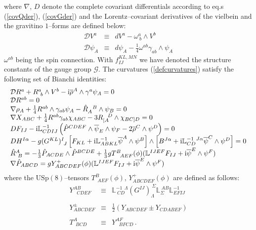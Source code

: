 \documentclass[a4paper,12pt]{article}
\def\bar{\overline}\end {picture}}
\begin{document}
where $\nabla$, $D$ denote the complete covariant differentials
according to eq.s (\ref{covQder}), (\ref{covGder}) and the
Lorentz--covariant
derivatives of the vielbein and the gravitino
$1$--forms are defined below:
\begin{eqnarray}
\mathcal{D} V^a &\equiv& dV^a-\omega ^a_{~b}\wedge V^b \nonumber \\
\mathcal{D}\psi_A &\equiv& d\psi_A - \frac{1}{4}\omega ^{ab}\gamma_{ab}\wedge\psi_A
\end{eqnarray}
$\omega ^{ab}$ being the spin connection. With $f_{IJ}^{KL,MN}$ we have denoted
the structure constants of the gauge group $\mathcal{G}$.
The curvatures (\ref{defcurvatures}) satisfy the following set of Bianchi identities:
\begin{equation}
\begin{array}{l}
\mathcal{D} R^a + R^a_{~b}\wedge V^b -{\rm i} \bar{\rho}^A\wedge\gamma^a\psi_A = 0 \nonumber\\
\mathcal{D} R^{ab} = 0 \nonumber\\
\nabla\rho _A + \frac{1}{4} R^{ab}\wedge\gamma_{ab}\psi_A - \hat{R}_{A}^{~~B}\wedge\psi_B =  0 \nonumber \\
\nabla X_{ABC} + \frac{1}{4} R^{ab}\gamma_{ab}\chi_{ABC} - 3
R_{[A}^{~~D}\wedge\chi_{BC]D} =  0 \nonumber \\
DF_{IJ} - {\rm i}\mathbb{L}^{-1}_{CDIJ}\left(\hat{P}^{CDEF}\wedge\bar{\psi}_E\wedge\psi_F
- 2 \bar{\rho}^C\wedge\psi^D\right) = 0 \nonumber\\
DH^{I\alpha} - g (G^{KL})^I_{~J}\left[F_{KL}+{\rm i}\mathbb{L}^{-1}_{ABKL}\bar{\psi}^A\wedge\psi^B\right]\wedge
\left[B^{J\alpha}+{\rm i}\mathbb{L}^{-1~J\alpha}_{CD}\bar{\psi}^C\wedge\psi^D\right] = 0\nonumber\\
\hat{R}^A_{~B}=-{1\over 3}\hat{P}_{ACDE}\wedge\hat{P}^{BCDE}+{1\over 3}gT^B_{~~AEF}(\phi)
(\mathbb{L}^{IJEF}F_{IJ}+{\rm i}{\bar \psi}^E\wedge\psi^F) \nonumber\\
\nabla\hat{P}_{ABCD}=gY^+_{ABCDEF}(\phi)(\mathbb{L}^{IJEF}F_{IJ}+{\rm i}{\bar \psi}^E\wedge\psi^F)
\nonumber\\
\end{array}
\label{bianchi}
\end{equation}
where the $\mathrm{USp(8)}$--tensors $T^B_{~~AEF}(\phi)$, $Y^+_{ABCDEF}(\phi)$ are defined as follows:
\begin{eqnarray}
Y^{AB}_{~~~CDEF}&\equiv&
\mathbb{L}^{-1~~\Lambda}_{~CD}(G^{IJ})_{\Lambda}^{~\Sigma}\mathbb{L}_{\Sigma}^{~AB}
\mathbb{L}^{-1}_{EFIJ}\\\nonumber\\
Y^{\pm}_{ABCDEF}&\equiv&\frac{1}{2}(Y_{ABCDEF}\pm Y_{CDABEF})\\\nonumber\\
T^A_{~~BCD}&\equiv&Y^{AF}_{~~~BFCD}\,.
\label{YTtensors}
\end{eqnarray}
\end{document}
